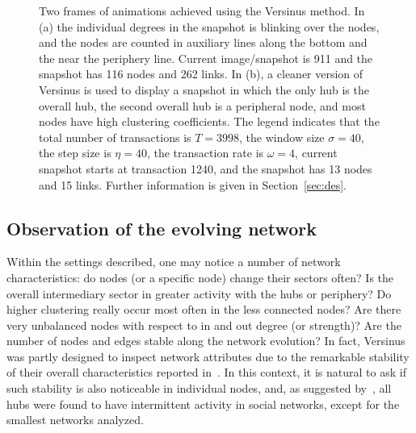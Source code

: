 \documentclass[runningheads]{llncs}
\begin{document}
\begin{figure}[!h]\centering
    \qquad
    \caption{Two frames of animations achieved using the Versinus method. In (a) the individual degrees in the snapshot is blinking over the nodes, and the nodes are counted in auxiliary lines along the bottom and the near the periphery line. Current image/snapshot is 911 and the snapshot has 116 nodes and 262 links.
   In (b), a cleaner version of Versinus is used to display a snapshot in which the only hub is the overall hub, the second overall hub is a peripheral node, and most nodes have high clustering coefficients. The legend indicates that the total number of transactions is $T=3998$, the window size $\sigma=40$, the step size is $\eta=40$, the transaction rate is $\omega=4$, current snapshot starts at transaction 1240, and the snapshot has 13 nodes and 15 links.
   Further information is given in Section~\ref{sec:des}.
   }%
    \label{fig:final}%
\end{figure}

\subsection{Observation of the evolving network}
Within the settings described, one may notice a number of network characteristics: do nodes (or a specific node) change their sectors often? Is the overall intermediary sector in greater activity with the hubs or periphery?
Do higher clustering really occur most often in the less connected nodes?
Are there very unbalanced nodes with respect to in and out degree (or strength)?
Are the number of nodes and edges stable along the network evolution?
In fact, Versinus was partly designed to inspect network attributes due to the remarkable stability of their overall characteristics reported in~\cite{stab}.
In this context, it is natural to ask if such stability is also noticeable in individual nodes, and, 
as suggested by~\cite{barabasiEvo}, all hubs were found to have intermittent activity in social networks, except for the smallest networks analyzed.
\end{document}
